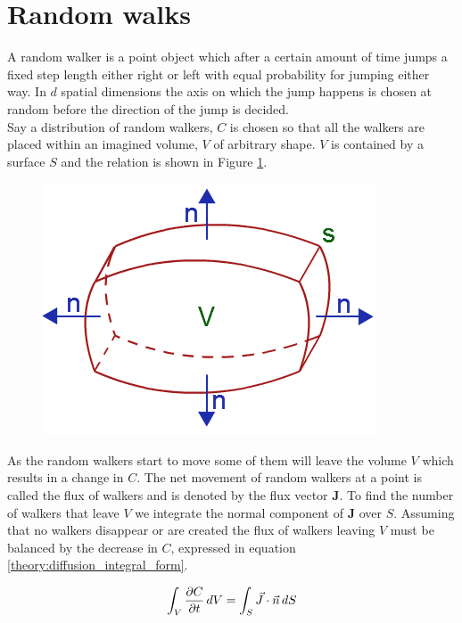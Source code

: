 \section{Random walks}

A random walker is a point object which after a certain amount of time jumps a fixed step length either right or left with equal probability for jumping either way. 
In $d$ spatial dimensions the axis on which the jump happens is chosen at random before the direction of the jump is decided. \\
Say a distribution of random walkers, $C$ is chosen so that all the walkers are placed within an imagined volume, $V$ of arbitrary shape. 
$V$ is contained by a surface $S$ and the relation is shown in Figure \ref{theory:divergence_theorem}. 

\begin{figure}[H]
\centering
\includegraphics[scale=0.6]{Figures/divergence_theorem.png}
 \caption[]{}
 \label{theory:divergence_theorem}
\end{figure}

\noindent As the random walkers start to move some of them will leave the volume $V$ which results in a change in $C$. 
The net movement of random walkers at a point is called the flux of walkers and is denoted by the flux vector $\mathbf J$. 
To find the number of walkers that leave $V$ we integrate the normal component of $\mathbf J$ over $S$. 
Assuming that no walkers disappear or are created the flux of walkers leaving $V$ must be balanced by the decrease in $C$, expressed in equation \eqref{theory:diffusion_integral_form}. 

\begin{equation}\label{theory:diffusion_integral_form}
 \int_V \frac{\partial C}{\partial t}\,dV = \int_S\vec{J}\cdot \vec{n}\,dS
\end{equation}

